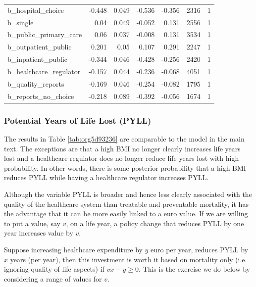 \documentclass[12pt,english,a4paper]{article}
\begin{document}
\begin{table}[htbp]
\begin{tabular}{lrrrrrr}
b\_hospital\_choice & -0.448 & 0.049 & -0.536 & -0.356 & 2316 & 1\\
b\_single & 0.04 & 0.049 & -0.052 & 0.131 & 2556 & 1\\
b\_public\_primary\_care & 0.06 & 0.037 & -0.008 & 0.131 & 3534 & 1\\
b\_outpatient\_public & 0.201 & 0.05 & 0.107 & 0.291 & 2247 & 1\\
b\_inpatient\_public & -0.344 & 0.046 & -0.428 & -0.256 & 2420 & 1\\
b\_healthcare\_regulator & -0.157 & 0.044 & -0.236 & -0.068 & 4051 & 1\\
b\_quality\_reports & -0.169 & 0.046 & -0.254 & -0.082 & 1795 & 1\\
b\_reports\_no\_choice & -0.218 & 0.089 & -0.392 & -0.056 & 1674 & 1\\
\end{tabular}
\end{table}



\subsubsection{Potential Years of Life Lost (PYLL)}
\label{sec:org4831bd1}
\label{sec:PYLL}

The results in Table \ref{tab:org5d93236} are comparable to the model in the main text. The exceptions are that a high BMI no longer clearly increases life years lost and a healthcare regulator does no longer reduce life years lost with high probability. In other words, there is some posterior probability that a high BMI reduces PYLL while having a healthcare regulator increases PYLL.

Although the variable PYLL is broader and hence less clearly associated with the quality of the healthcare system than treatable and preventable mortality, it has the advantage that it can be more easily linked to a euro value. If we are willing to put a value, say \(v\), on a life year, a policy change that reduces PYLL by one year increases value by \(v\). 

Suppose increasing healthcare expenditure by \(y\) euro per year, reduces PYLL by \(x\) years (per year), then this investment is worth it based on mortality only (i.e. ignoring quality of life aspects) if \(v x - y \geq 0\). This is the exercise we do below by considering a range of values for \(v\).
\end{document}
